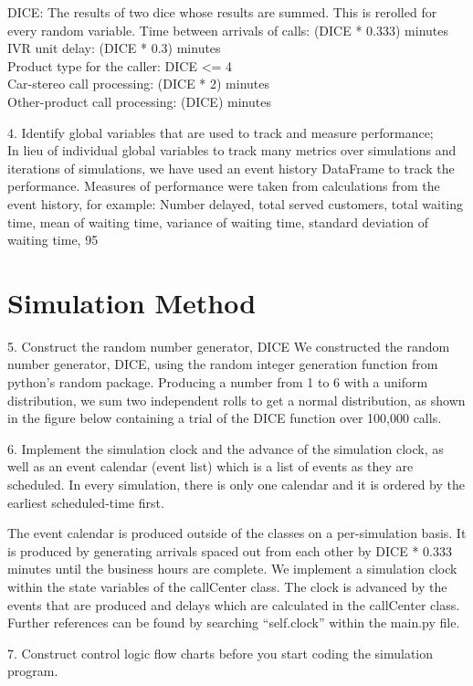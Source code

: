\documentclass{article}
\begin{document}
DICE: The results of two dice whose results are summed. This is rerolled for every random variable.
Time between arrivals of calls: (DICE * 0.333) minutes \\
IVR unit delay: (DICE * 0.3) minutes \\
Product type for the caller: DICE <= 4 \\
Car-stereo call processing: (DICE * 2) minutes \\
Other-product call processing: (DICE) minutes \\
\par
4. Identify global variables that are used to track and measure performance; \\
In lieu of individual global variables to track many metrics over simulations and iterations of simulations, we have used an event history DataFrame to track the performance. Measures of performance were taken from calculations from the event history, for example: Number delayed, total served customers, total waiting time, mean of waiting time, variance of waiting time, standard deviation of waiting time, 95%



\section{Simulation Method}

5. Construct the random number generator, DICE
We constructed the random number generator, DICE, using the random integer generation function from python’s random package. Producing a number from 1 to 6 with a uniform distribution, we sum two independent rolls to get a normal distribution, as shown in the figure below containing a trial of the DICE function over 100,000 calls. \\
\par

6. Implement the simulation clock and the advance of the simulation clock, as well as an event calendar (event list) which is a list of events as they are scheduled. In every simulation, there is only one calendar and it is ordered by the earliest scheduled-time first. \\
\par

The event calendar is produced outside of the classes on a per-simulation basis. It is produced by generating arrivals spaced out from each other by DICE * 0.333 minutes until the business hours are complete. We implement a simulation clock within the state variables of the callCenter class. The clock is advanced by the events that are produced and delays which are calculated in the callCenter class. Further references can be found by searching “self.clock” within the main.py file. \\
\par
7. Construct control logic flow charts before you start coding the simulation program. \\
\end{document}
